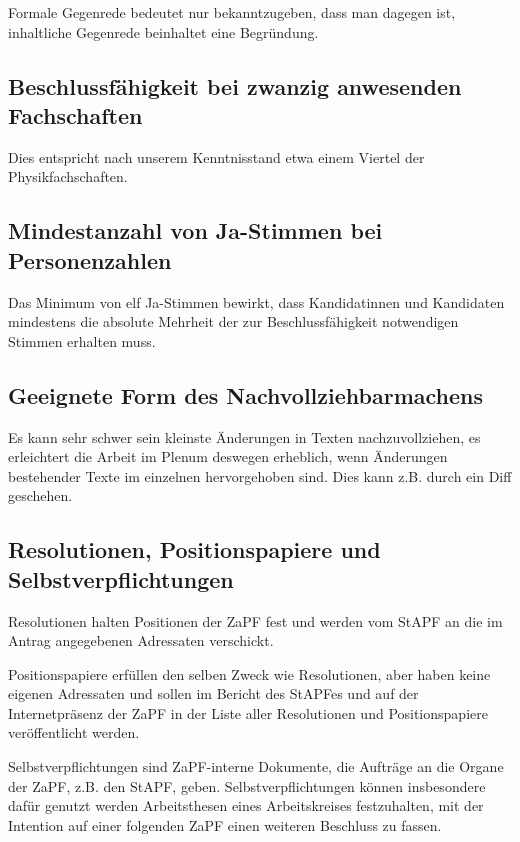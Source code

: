 \documentclass[12pt,oneside]{scrartcl}
\begin{document}
Formale Gegenrede bedeutet nur bekanntzugeben, dass man dagegen ist, inhaltliche
Gegenrede beinhaltet eine Begründung.


\subsection{Beschlussfähigkeit bei zwanzig anwesenden Fachschaften%
  \label{beschlussfahigkeit-bei-zwanzig-anwesenden-fachschaften}%
}

Dies entspricht nach unserem Kenntnisstand etwa einem Viertel der Physikfachschaften.


\subsection{Mindestanzahl von Ja-Stimmen bei Personenzahlen%
  \label{mindestanzahl-von-ja-stimmen-bei-personenzahlen}%
}

Das Minimum von elf Ja-Stimmen bewirkt, dass Kandidatinnen und Kandidaten
mindestens die absolute Mehrheit der zur Beschlussfähigkeit notwendigen Stimmen
erhalten muss.


\subsection{Geeignete Form des Nachvollziehbarmachens%
  \label{geeignete-form-des-nachvollziehbarmachens}%
}

Es kann sehr schwer sein kleinste Änderungen in Texten nachzuvollziehen, es
erleichtert die Arbeit im Plenum deswegen erheblich, wenn Änderungen bestehender
Texte im einzelnen hervorgehoben sind. Dies kann z.B. durch ein Diff geschehen.


\subsection{Resolutionen, Positionspapiere und Selbstverpflichtungen%
  \label{resolutionen-positionspapiere-und-selbstverpflichtungen}%
}

Resolutionen halten Positionen der ZaPF fest und werden vom StAPF an die im
Antrag angegebenen Adressaten verschickt.

Positionspapiere erfüllen den selben Zweck wie Resolutionen, aber haben keine
eigenen Adressaten und sollen im Bericht des StAPFes und auf der
Internetpräsenz der ZaPF in der Liste aller Resolutionen und Positionspapiere
veröffentlicht werden.

Selbstverpflichtungen sind ZaPF-interne Dokumente, die Aufträge an die Organe
der ZaPF, z.B. den StAPF, geben. Selbstverpflichtungen können insbesondere dafür
genutzt werden Arbeitsthesen eines Arbeitskreises festzuhalten, mit der
Intention auf einer folgenden ZaPF einen weiteren Beschluss zu fassen.
\end{document}

